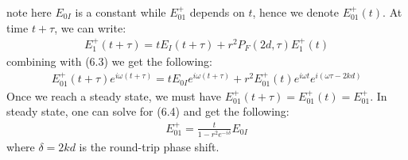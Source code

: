 \documentclass[11pt]{book}
\theoremstyle{break}
\theoremstyle{break}
\begin{document}
note here $E_{0I}$ is a constant while $E_{01}^+$ depends on $t$, hence we denote $E_{01}^+(t)$. At time $t + \tau$, we can write:
\begin{align*}
E_1^{+}(t+\tau) = tE_I(t+\tau) + r^2 P_F(2d, \tau) E_1^+(t)
\end{align*}
combining with (6.3) we get the following:
\begin{align}
E_{01}^+(t+\tau)e^{i\omega (t+\tau)} = t E_{0I}e^{i\omega(t+\tau)} + r^2 E_{01}^+(t)e^{i\omega t}e^{i(\omega \tau -2kd)}
\end{align}
Once we reach a steady state, we must have $E_{01}^+(t+\tau) = E_{01}^+(t) = E_{01}^+$. In steady state, one can solve for (6.4) and get the following:
\begin{align*}
E_{01}^+ = \frac{t}{1-r^2 e^{-i\delta}}E_{0I}
\end{align*}
where $\delta = 2kd$ is the round-trip phase shift.\\\
\end{document}
